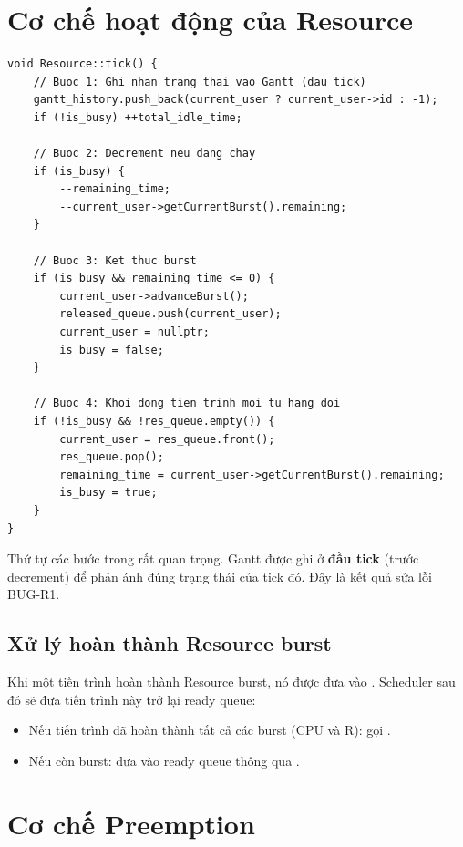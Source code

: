 \section{Cơ chế hoạt động của Resource}

\begin{lstlisting}[caption={Resource::tick() -- xu\^at Gantt truoc decrement}]
void Resource::tick() {
    // Buoc 1: Ghi nhan trang thai vao Gantt (dau tick)
    gantt_history.push_back(current_user ? current_user->id : -1);
    if (!is_busy) ++total_idle_time;
    
    // Buoc 2: Decrement neu dang chay
    if (is_busy) {
        --remaining_time;
        --current_user->getCurrentBurst().remaining;
    }
    
    // Buoc 3: Ket thuc burst
    if (is_busy && remaining_time <= 0) {
        current_user->advanceBurst();
        released_queue.push(current_user);
        current_user = nullptr;
        is_busy = false;
    }
    
    // Buoc 4: Khoi dong tien trinh moi tu hang doi
    if (!is_busy && !res_queue.empty()) {
        current_user = res_queue.front();
        res_queue.pop();
        remaining_time = current_user->getCurrentBurst().remaining;
        is_busy = true;
    }
}
\end{lstlisting}

Thứ tự các bước trong  rất quan trọng. Gantt được ghi ở \textbf{đầu tick} (trước decrement) để phản ánh đúng trạng thái của tick đó. Đây là kết quả sửa lỗi BUG-R1.

\subsection{Xử lý hoàn thành Resource burst}

Khi một tiến trình hoàn thành Resource burst, nó được đưa vào . Scheduler sau đó sẽ đưa tiến trình này trở lại ready queue:
\begin{itemize}
    \item Nếu tiến trình đã hoàn thành tất cả các burst (CPU và R): gọi \linebreak[4].
    \item Nếu còn burst: đưa vào ready queue thông qua .
\end{itemize}

\section{Cơ chế Preemption}

